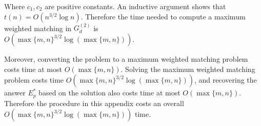 \documentclass[10pt,fleqn]{article}
\begin{document}
	Where $c_1,c_2$ are positive constants. An inductive argument shows that $t(n)=O(n^{3/2}\log n)$. Therefore the time needed to compute a maximum weighted matching in $G_d^{(2)}$ is \\ $O(\max\{m,n\}^{3/2}\log(\max\{m,n\}))$. \par
	Moreover, converting the problem to a maximum weighted matching problem costs time at most $O(\max\{m,n\})$. Solving the maximum weighted matching problem costs time $O(\max\{m,n\}^{3/2}\log(\max\{m,n\}))$, and recovering the answer $E_p^*$ based on the solution also costs time at most $O(\max\{m,n\})$. Therefore the procedure in this appendix costs an overall $O(\max\{m,n\}^{3/2}\log(\max\{m,n\}))$ time.
	
	
	
\end{document}
